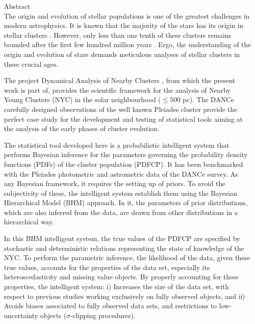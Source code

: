 

{\LARGE Abstract}\\

The origin and evolution of stellar populations is one of the greatest challenges in modern astrophysics. It is known that the majority of the stars has its origin in stellar clusters \citep{2000AJ....120.3139C, 2003AJ....126.1916P,2003ARA&A..41...57L}. However, only less than one tenth of these clusters remains bounded after the first few hundred million years \citep{2003ARA&A..41...57L}. Ergo, the understanding of the origin and evolution of stars demands meticulous analyses of stellar clusters in these crucial ages.

The project Dynamical Analysis of Nearby Clusters \cite[DANCe,][]{Bouy2013}, from which the present work is part of, provides the scientific framework for the analysis of Nearby Young Clusters (NYC) in the solar neighbourhood ($\leq 500$ pc). The DANCe carefully designed observations of the well known Pleiades cluster provide the perfect case study for the development and testing of statistical tools aiming at the analysis of the early phases of cluster evolution.

The statistical tool developed here is a probabilistic intelligent system that performs Bayesian inference for the parameters governing the probability density functions (PDFs) of the cluster population (PDFCP). It has been benchmarked with the Pleiades photometric and astrometric data of the DANCe survey. As any Bayesian framework, it requires the setting up of priors. To avoid the subjectivity of these, the intelligent system establish them using the Bayesian Hierarchical Model (BHM) approach. In it, the parameters of prior distributions, which are also inferred from the data, are drawn from other distributions in a hierarchical way. 

In this BHM intelligent system, the true values of the PDFCP are specified by stochastic and deterministic relations representing the state of knowledge of the NYC. To perform the parametric inference, the likelihood of the data, given these true values, accounts for the properties of the data set, especially its heteroscedasticity and missing value objects. By properly accounting for these properties, the intelligent system: i) Increases the size of the data set, with respect to previous studies working exclusively on fully observed objects, and ii) Avoids biases associated to fully observed data sets, and restrictions to low-uncertainty objects ($\sigma$-clipping procedures).


